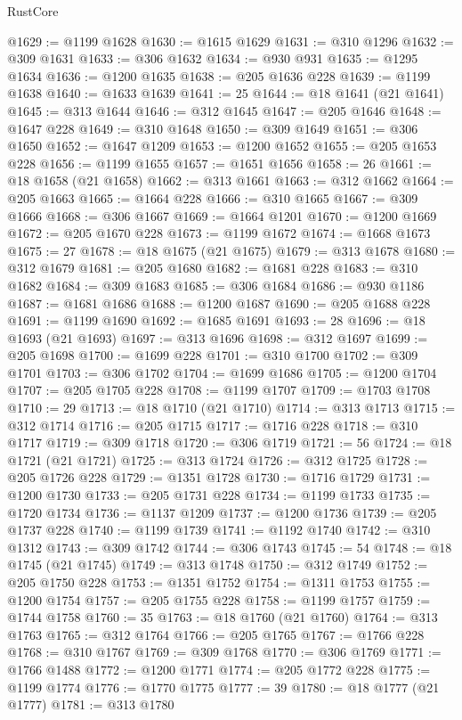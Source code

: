 \begin{lexlean}{RustCore}
\begin{coremodule}
@1629 := @1199 @1628
@1630 := @1615 @1629
@1631 := @310 @1296
@1632 := @309 @1631
@1633 := @306 @1632
@1634 := @930 @931
@1635 := @1295 @1634
@1636 := @1200 @1635
@1638 := @205 @1636 @228
@1639 := @1199 @1638
@1640 := @1633 @1639
@1641 := 25
@1644 := @18 @1641 (@21 @1641)
@1645 := @313 @1644
@1646 := @312 @1645
@1647 := @205 @1646
@1648 := @1647 @228
@1649 := @310 @1648
@1650 := @309 @1649
@1651 := @306 @1650
@1652 := @1647 @1209
@1653 := @1200 @1652
@1655 := @205 @1653 @228
@1656 := @1199 @1655
@1657 := @1651 @1656
@1658 := 26
@1661 := @18 @1658 (@21 @1658)
@1662 := @313 @1661
@1663 := @312 @1662
@1664 := @205 @1663
@1665 := @1664 @228
@1666 := @310 @1665
@1667 := @309 @1666
@1668 := @306 @1667
@1669 := @1664 @1201
@1670 := @1200 @1669
@1672 := @205 @1670 @228
@1673 := @1199 @1672
@1674 := @1668 @1673
@1675 := 27
@1678 := @18 @1675 (@21 @1675)
@1679 := @313 @1678
@1680 := @312 @1679
@1681 := @205 @1680
@1682 := @1681 @228
@1683 := @310 @1682
@1684 := @309 @1683
@1685 := @306 @1684
@1686 := @930 @1186
@1687 := @1681 @1686
@1688 := @1200 @1687
@1690 := @205 @1688 @228
@1691 := @1199 @1690
@1692 := @1685 @1691
@1693 := 28
@1696 := @18 @1693 (@21 @1693)
@1697 := @313 @1696
@1698 := @312 @1697
@1699 := @205 @1698
@1700 := @1699 @228
@1701 := @310 @1700
@1702 := @309 @1701
@1703 := @306 @1702
@1704 := @1699 @1686
@1705 := @1200 @1704
@1707 := @205 @1705 @228
@1708 := @1199 @1707
@1709 := @1703 @1708
@1710 := 29
@1713 := @18 @1710 (@21 @1710)
@1714 := @313 @1713
@1715 := @312 @1714
@1716 := @205 @1715
@1717 := @1716 @228
@1718 := @310 @1717
@1719 := @309 @1718
@1720 := @306 @1719
@1721 := 56
@1724 := @18 @1721 (@21 @1721)
@1725 := @313 @1724
@1726 := @312 @1725
@1728 := @205 @1726 @228
@1729 := @1351 @1728
@1730 := @1716 @1729
@1731 := @1200 @1730
@1733 := @205 @1731 @228
@1734 := @1199 @1733
@1735 := @1720 @1734
@1736 := @1137 @1209
@1737 := @1200 @1736
@1739 := @205 @1737 @228
@1740 := @1199 @1739
@1741 := @1192 @1740
@1742 := @310 @1312
@1743 := @309 @1742
@1744 := @306 @1743
@1745 := 54
@1748 := @18 @1745 (@21 @1745)
@1749 := @313 @1748
@1750 := @312 @1749
@1752 := @205 @1750 @228
@1753 := @1351 @1752
@1754 := @1311 @1753
@1755 := @1200 @1754
@1757 := @205 @1755 @228
@1758 := @1199 @1757
@1759 := @1744 @1758
@1760 := 35
@1763 := @18 @1760 (@21 @1760)
@1764 := @313 @1763
@1765 := @312 @1764
@1766 := @205 @1765
@1767 := @1766 @228
@1768 := @310 @1767
@1769 := @309 @1768
@1770 := @306 @1769
@1771 := @1766 @1488
@1772 := @1200 @1771
@1774 := @205 @1772 @228
@1775 := @1199 @1774
@1776 := @1770 @1775
@1777 := 39
@1780 := @18 @1777 (@21 @1777)
@1781 := @313 @1780

\end{coremodule}
\end{lexlean}
